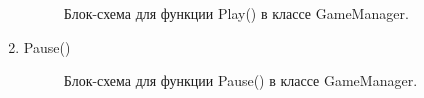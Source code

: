 \documentclass[14pt, oneside]{altsu-report}
\begin{document}
\begin{enumerate}
\begin{figure}[H]
\caption{Блок-схема для функции Play() в классе GameManager.}
\end{figure}

\item Pause()

\begin{figure}[H]
\caption{Блок-схема для функции Pause() в классе GameManager.}
\end{figure}


\end{enumerate}
\end{document}
